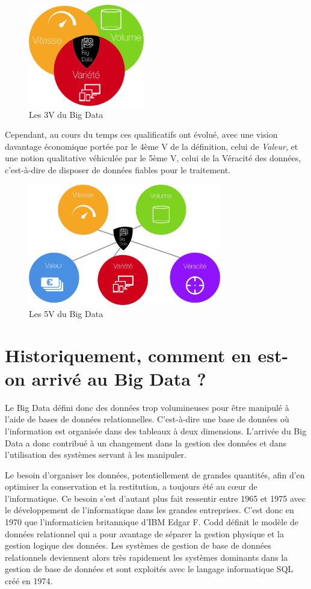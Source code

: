 \documentclass[12pt]{article}
\begin{document}
\begin{figure}[H]
\centering
\includegraphics[width=0.45\textwidth]{3V}
\caption{Les 3V du Big Data}
\end{figure}
Cependant, au cours du temps ces qualificatifs ont évolué, avec une vision davantage économique portée par le 4ème V de la définition, celui de \emph{Valeur}, et une notion qualitative véhiculée par le 5ème V, celui de la Véracité des données, c'est-à-dire de disposer de données fiables pour le traitement. 
\begin{figure}[H]
\centering
\includegraphics[width=0.75\textwidth]{5V}
\caption{Les 5V du Big Data}
\end{figure}
\section{Historiquement, comment en est-on arrivé au Big Data ?}
Le Big Data défini donc des données trop volumineuses pour être manipulé à l’aide de bases de données relationnelles. C’est-à-dire une base de données où l'information est organisée dans des tableaux à deux dimensions. L’arrivée du Big Data a donc contribué à un changement dans la gestion des données et dans l’utilisation des systèmes servant à les manipuler.\par
Le besoin d’organiser les données, potentiellement de grandes quantités, afin d’en optimiser la conservation et la restitution, a toujours été au cœur de l’informatique. Ce besoin s’est d’autant plus fait ressentir entre 1965 et 1975 avec le développement de l’informatique dans les grandes entreprises. C’est donc en 1970 que l’informaticien britannique d’IBM  Edgar F. Codd définit le modèle de données relationnel qui a pour avantage de séparer la gestion physique et la gestion logique des données. Les systèmes de gestion de base de données relationnels deviennent alors très rapidement les systèmes dominants dans la gestion de base de données et sont exploités avec le langage informatique SQL créé en 1974.
\end{document}
